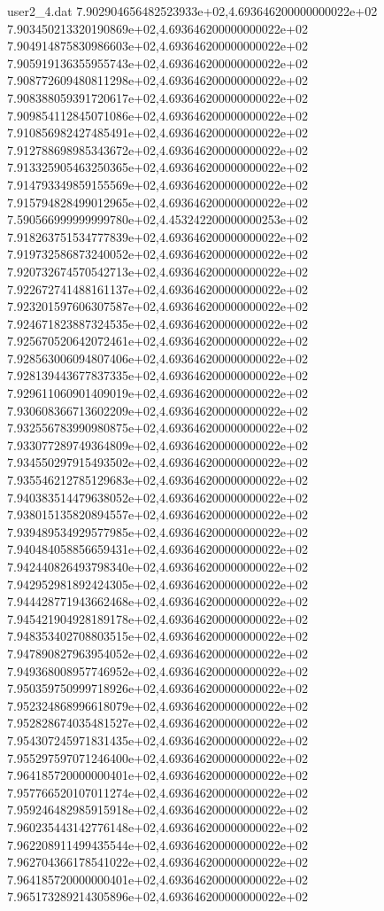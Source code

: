 \begin{filecontents}{user2_4.dat}
7.902904656482523933e+02,4.693646200000000022e+02
7.903450213320190869e+02,4.693646200000000022e+02
7.904914875830986603e+02,4.693646200000000022e+02
7.905919136355955743e+02,4.693646200000000022e+02
7.908772609480811298e+02,4.693646200000000022e+02
7.908388059391720617e+02,4.693646200000000022e+02
7.909854112845071086e+02,4.693646200000000022e+02
7.910856982427485491e+02,4.693646200000000022e+02
7.912788698985343672e+02,4.693646200000000022e+02
7.913325905463250365e+02,4.693646200000000022e+02
7.914793349859155569e+02,4.693646200000000022e+02
7.915794828499012965e+02,4.693646200000000022e+02
7.590566999999999780e+02,4.453242200000000253e+02
7.918263751534777839e+02,4.693646200000000022e+02
7.919732586873240052e+02,4.693646200000000022e+02
7.920732674570542713e+02,4.693646200000000022e+02
7.922672741488161137e+02,4.693646200000000022e+02
7.923201597606307587e+02,4.693646200000000022e+02
7.924671823887324535e+02,4.693646200000000022e+02
7.925670520642072461e+02,4.693646200000000022e+02
7.928563006094807406e+02,4.693646200000000022e+02
7.928139443677837335e+02,4.693646200000000022e+02
7.929611060901409019e+02,4.693646200000000022e+02
7.930608366713602209e+02,4.693646200000000022e+02
7.932556783990980875e+02,4.693646200000000022e+02
7.933077289749364809e+02,4.693646200000000022e+02
7.934550297915493502e+02,4.693646200000000022e+02
7.935546212785129683e+02,4.693646200000000022e+02
7.940383514479638052e+02,4.693646200000000022e+02
7.938015135820894557e+02,4.693646200000000022e+02
7.939489534929577985e+02,4.693646200000000022e+02
7.940484058856659431e+02,4.693646200000000022e+02
7.942440826493798340e+02,4.693646200000000022e+02
7.942952981892424305e+02,4.693646200000000022e+02
7.944428771943662468e+02,4.693646200000000022e+02
7.945421904928189178e+02,4.693646200000000022e+02
7.948353402708803515e+02,4.693646200000000022e+02
7.947890827963954052e+02,4.693646200000000022e+02
7.949368008957746952e+02,4.693646200000000022e+02
7.950359750999718926e+02,4.693646200000000022e+02
7.952324868996618079e+02,4.693646200000000022e+02
7.952828674035481527e+02,4.693646200000000022e+02
7.954307245971831435e+02,4.693646200000000022e+02
7.955297597071246400e+02,4.693646200000000022e+02
7.964185720000000401e+02,4.693646200000000022e+02
7.957766520107011274e+02,4.693646200000000022e+02
7.959246482985915918e+02,4.693646200000000022e+02
7.960235443142776148e+02,4.693646200000000022e+02
7.962208911499435544e+02,4.693646200000000022e+02
7.962704366178541022e+02,4.693646200000000022e+02
7.964185720000000401e+02,4.693646200000000022e+02
7.965173289214305896e+02,4.693646200000000022e+02

\end{filecontents}
